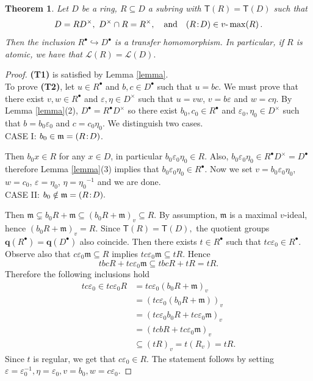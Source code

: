 \documentclass[a4paper, 10pt]{amsart}
\renewcommand{\epsilon}{\varepsilon}
\theoremstyle{plain}
\newtheorem{theorem}{Theorem}[section]
\theoremstyle{definition}
\theoremstyle{remark}
\newcommand{\DP}{\negthinspace : \negthinspace}
\numberwithin{equation}{section}
\begin{document}
 \begin{theorem}\label{prop2}
		Let $D$ be a ring, $R \subseteq D$ a subring with $\mathsf T (R)=\mathsf T (D)$ such that
\[
D = RD^{\times}, \  D^{\times} \cap R = R^{\times}, \quad \text{and} \quad { (R \DP D) \in v\text{-}\max (R)}  \,.
\]
Then the inclusion $R^{\bullet} \hookrightarrow D^{\bullet}$ is a transfer homomorphism.  In particular, if $R$ is atomic, we have that $\mathcal{L}(R)=\mathcal{L}(D).$
	\end{theorem}
 \begin{proof}
		\textbf{(T1)} is satisfied by Lemma \ref{lemma}.\\
		To prove \textbf{(T2)}, let $u \in R^{\bullet}$ and $b,c \in D^{\bullet}$ such that $u=bc$. We must prove that there exist $v, w \in R^{\bullet}$ and $\epsilon, \eta \in D^\times$ such that $u=vw$, $v=b\epsilon$ and $w=c\eta$. By Lemma \ref{lemma}(2), $D^{\bullet}=R^{\bullet}D^\times$ so there exist $b_0, c_0 \in R^{\bullet}$ and $\epsilon_0, \eta_0 \in  D^\times$ such that $b=b_0 \epsilon_0$ and $c=c_0 \eta_0$. We distinguish two cases.\\
		CASE I: $b_0 \in \mathfrak{m}=(R\DP D)$.
		
		Then $b_0 x \in R$ for any $x \in D$, in particular $b_0 \epsilon_0 \eta_0 \in R$. Also, $b_0 \epsilon_0 \eta_0 \in R^{\bullet}D^\times=D^{\bullet}$ therefore Lemma \ref{lemma}(3) implies that $b_0 \epsilon_0 \eta_0 \in R^{\bullet}$. Now we set $v=b_0 \epsilon_0 \eta_0$, $w=c_0$, $\epsilon= \eta_0$, $\eta={\eta_0}^{-1}$ and we are done.  \\
	CASE II: $b_0\notin \mathfrak{m}=(R\DP D).$

 Then $\mathfrak{m}\subsetneq b_0R+ \mathfrak{m}\subseteq (b_0R+\mathfrak{m})_v\subseteq R $. By assumption, $\mathfrak{m}$ is a maximal $v$-ideal, hence $(b_0R+\mathfrak{m})_v= R.$ Since $\mathsf{T}(R)=\mathsf T(D),$ the quotient groups $\mathbf{q}(R^\bullet)=\mathbf{q}(D^\bullet)$ also coincide. 
 Then there exists $t\in R^\bullet$ such that $tc\epsilon_0\in R^\bullet.$ Observe also that $c\epsilon_0\mathfrak{m}\subseteq R$ implies  $tc\epsilon_0\mathfrak{m} \subseteq tR.$ Hence $$tbcR+ tc\epsilon_0\mathfrak{m}\subseteq tbcR+ tR=tR.$$ Therefore the following inclusions hold
\begin{equation*}
    \begin{split}
        tc\epsilon_0\in tc\epsilon_0R &=tc\epsilon_0(b_0R+ \mathfrak{m})_v\\
        &= (tc\epsilon_0(b_0R+  \mathfrak{m}))_v\\
        &=(tc\epsilon_0b_0R+ tc\epsilon_0\mathfrak{m})_v\\
        &=(tcbR+ tc\epsilon_0\mathfrak{m})_v \\ 
        &\subseteq (tR)_v =t(R_v)=tR.
    \end{split}
\end{equation*}
Since $t$ is regular, we get that $c\epsilon_0\in R.$ The statement follows by setting $\epsilon=\epsilon_0^{-1},\eta=\epsilon_0, v= b_0,w=c\epsilon_0.$
	\end{proof}
\end{document}
